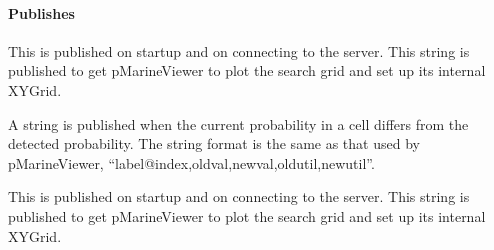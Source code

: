\paragraph{Publishes}
\begin{hangpar}{\pin}{}
This is published on startup and on connecting to the server.  This string is published to get pMarineViewer to plot the search grid and set up its internal XYGrid.
\end{hangpar}
\begin{hangpar}{\pin}{}
A  string is published when the current probability in a  cell differs from the detected probability.  The string format is the same as that used by pMarineViewer, ``label@index,oldval,newval,oldutil,newutil''.
\end{hangpar}
\begin{hangpar}{\pin}{}
This is published on startup and on connecting to the server.  This string is published to get pMarineViewer to plot the search grid and set up its internal XYGrid.
\end{hangpar}
